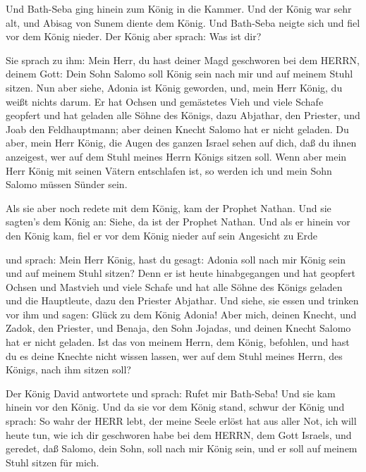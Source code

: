  Und Bath-Seba ging hinein zum König in die Kammer. Und der
König war sehr alt, und Abisag von Sunem diente dem König. 
Und Bath-Seba neigte sich und fiel vor dem König nieder. Der König aber
sprach: Was ist dir?

 Sie sprach zu ihm: Mein Herr, du hast deiner Magd
geschworen bei dem HERRN, deinem Gott: Dein Sohn Salomo soll König sein
nach mir und auf meinem Stuhl sitzen.  Nun aber siehe,
Adonia ist König geworden, und, mein Herr König, du weißt nichts darum.
 Er hat Ochsen und gemästetes Vieh und viele Schafe
geopfert und hat geladen alle Söhne des Königs, dazu Abjathar, den
Priester, und Joab den Feldhauptmann; aber deinen Knecht Salomo hat er
nicht geladen.  Du aber, mein Herr König, die Augen des
ganzen Israel sehen auf dich, daß du ihnen anzeigest, wer auf dem Stuhl
meines Herrn Königs sitzen soll.  Wenn aber mein Herr König
mit seinen Vätern entschlafen ist, so werden ich und mein Sohn Salomo
müssen Sünder sein.

 Als sie aber noch redete mit dem König, kam der Prophet
Nathan.  Und sie sagten's dem König an: Siehe, da ist der
Prophet Nathan. Und als er hinein vor den König kam, fiel er vor dem
König nieder auf sein Angesicht zu Erde

 und sprach: Mein Herr König, hast du gesagt: Adonia soll
nach mir König sein und auf meinem Stuhl sitzen?  Denn er
ist heute hinabgegangen und hat geopfert Ochsen und Mastvieh und viele
Schafe und hat alle Söhne des Königs geladen und die Hauptleute, dazu
den Priester Abjathar. Und siehe, sie essen und trinken vor ihm und
sagen: Glück zu dem König Adonia!  Aber mich, deinen
Knecht, und Zadok, den Priester, und Benaja, den Sohn Jojadas, und
deinen Knecht Salomo hat er nicht geladen.  Ist das von
meinem Herrn, dem König, befohlen, und hast du es deine Knechte nicht
wissen lassen, wer auf dem Stuhl meines Herrn, des Königs, nach ihm
sitzen soll?

 Der König David antwortete und sprach: Rufet mir
Bath-Seba! Und sie kam hinein vor den König. Und da sie vor dem König
stand,  schwur der König und sprach: So wahr der HERR lebt,
der meine Seele erlöst hat aus aller Not,  ich will heute
tun, wie ich dir geschworen habe bei dem HERRN, dem Gott Israels, und
geredet, daß Salomo, dein Sohn, soll nach mir König sein, und er soll
auf meinem Stuhl sitzen für mich.

